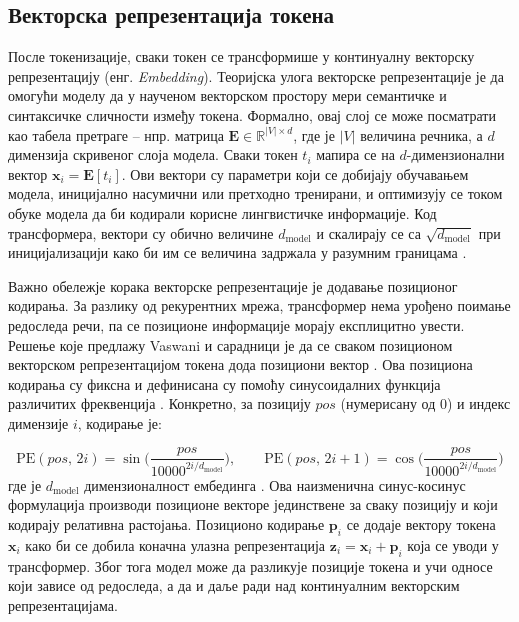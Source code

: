 \subsection{Векторска репрезентација токена}

После токенизације, сваки токен се трансформише у континуалну векторску репрезентацију (енг. \textit{Embedding}). Теоријска улога векторске репрезентације је да омогући моделу да у наученом векторском простору мери семантичке и синтаксичке сличности између токена. Формално, овај слој се може посматрати као табела претраге -- нпр. матрица $\mathbf{E} \in \mathbb{R}^{|V| \times d}$, где је $|V|$ величина речника, а $d$ димензија скривеног слоја модела. Сваки токен $t_i$ мапира се на $d$-димензионални вектор $\mathbf{x}_i = \mathbf{E}[t_i]$. Ови вектори су параметри који се добијају обучавањем модела, иницијално насумични или претходно тренирани, и оптимизују се током обуке модела да би кодирали корисне лингвистичке информације. Код трансформера, вектори су обично величине $d_{\text{model}}$ и скалирају се са $\sqrt{d_{\text{model}}}$ при иницијализацији како би им се величина задржала у разумним границама \cite{vaswani_attention_2017}.
\newline

Важно обележје корака векторске репрезентације је додавање позиционог кодирања. За разлику од рекурентних мрежа, трансформер нема урођено поимање редоследа речи, па се позиционе информације морају експлицитно увести. Решење које предлажу Vaswani и сарадници је да се сваком позиционом векторском репрезентацијом токена дода позициони вектор \cite{vaswani_attention_2017}. Ова позициона кодирања су фиксна и дефинисана су помоћу синусоидалних функција различитих фреквенција \cite{vaswani_attention_2017}. Конкретно, за позицију $pos$ (нумерисану од 0) и индекс димензије $i$, кодирање је:
\newline

\begin{equation}
\text{PE}(pos,\,2i) = \sin\!\Big(\frac{pos}{10000^{2i/d_{\text{model}}}}\Big), \qquad \text{PE}(pos,\,2i+1) = \cos\!\Big(\frac{pos}{10000^{2i/d_{\text{model}}}}\Big)
\label{eq:positional_encoding}
\end{equation}
\newline
\newline
где је $d_{\text{model}}$ димензионалност ембединга \cite{vaswani_attention_2017}. Ова наизменична синус-косинус формулација производи позиционе векторе јединствене за сваку позицију и који кодирају релативна растојања. Позиционо кодирање $\mathbf{p}_i$ се додаје вектору токена $\mathbf{x}_i$ како би се добила коначна улазна репрезентација $\mathbf{z}_i = \mathbf{x}_i + \mathbf{p}_i$ која се уводи у трансформер. Због тога модел може да разликује позиције токена и учи односе који зависе од редоследа, а да и даље ради над континуалним векторским репрезентацијама.

